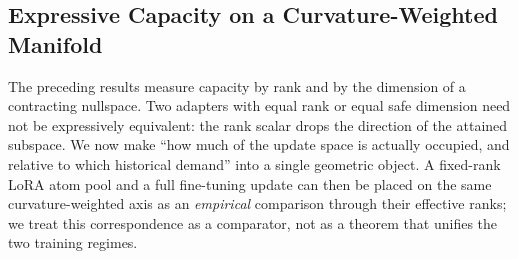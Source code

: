 \subsection{Expressive Capacity on a Curvature-Weighted Manifold}
\label{sec:expressivity}

The preceding results measure capacity by rank and by the dimension of a
contracting nullspace. Two adapters with equal rank or equal safe dimension need
not be expressively equivalent: the rank scalar drops the direction of the
attained subspace. We now make ``how much of the update space is actually
occupied, and relative to which historical demand'' into a single geometric
object. A fixed-rank LoRA atom pool and a full fine-tuning update can then be
placed on the same curvature-weighted axis as an \emph{empirical} comparison
through their effective ranks; we treat this correspondence as a comparator, not
as a theorem that unifies the two training regimes.

